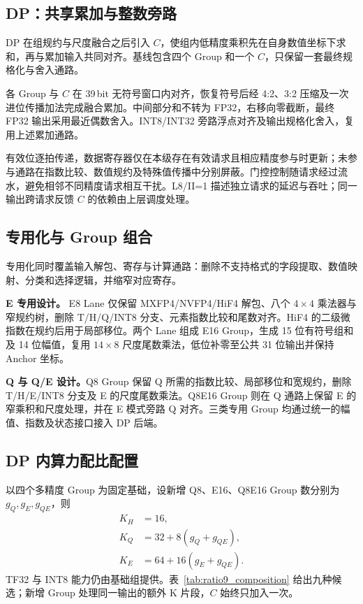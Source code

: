 \subsection{DP：共享累加与整数旁路}

DP 在组规约与尺度融合之后引入 $C$，使组内低精度乘积先在自身数值坐标下求和，再与累加输入共同对齐。基线包含四个 Group 和一个 $C$，只保留一套最终规格化与舍入通路。

各 Group 与 $C$ 在 39\,bit 无符号窗口内对齐，恢复符号后经 4:2、3:2 压缩及一次进位传播加法完成融合累加。中间部分和不转为 FP32，右移向零截断，最终 FP32 输出采用最近偶数舍入。INT8/INT32 旁路浮点对齐及输出规格化舍入，复用上述累加通路。

有效位逐拍传递，数据寄存器仅在本级存在有效请求且相应精度参与时更新；未参与通路在指数比较、数值规约及特殊值传播中分别屏蔽。门控控制随请求经过流水，避免相邻不同精度请求相互干扰。L8/II=1 描述独立请求的延迟与吞吐；同一输出跨请求反馈 $C$ 的依赖由上层调度处理。

\subsection{专用化与 Group 组合}
\label{sec:specialized_midgroups}

专用化同时覆盖输入解包、寄存与计算通路：删除不支持格式的字段提取、数值映射、分类和选择逻辑，并缩窄对应寄存。

\textbf{E 专用设计。} E8 Lane 仅保留 MXFP4/NVFP4/HiF4 解包、八个 $4\times4$ 乘法器与窄规约树，删除 T/H/Q/INT8 分支、元素指数比较和尾数对齐。HiF4 的二级微指数在规约后用于局部移位。两个 Lane 组成 E16 Group，生成 15 位有符号组和及 14 位幅值，复用 $14\times8$ 尺度尾数乘法，低位补零至公共 31 位输出并保持 Anchor 坐标。

\textbf{Q 与 Q/E 设计。}Q8 Group 保留 Q 所需的指数比较、局部移位和宽规约，删除 T/H/E/INT8 分支及 E 的尺度尾数乘法。Q8E16 Group 则在 Q 通路上保留 E 的窄乘积和尺度处理，并在 E 模式旁路 Q 对齐。三类专用 Group 均通过统一的幅值、指数及状态接口接入 DP 后端。

\subsection{DP 内算力配比配置}
\label{sec:expansion}

以四个多精度 Group 为固定基础，设新增 Q8、E16、Q8E16 Group 数分别为 $g_Q,g_E,g_{QE}$，则
\begin{equation}
\begin{aligned}
K_H&=16,\\
K_Q&=32+8(g_Q+g_{QE}),\\
K_E&=64+16(g_E+g_{QE}).
\end{aligned}
\label{eq:group_capacity}
\end{equation}
TF32 与 INT8 能力仍由基础组提供。表~\ref{tab:ratio9_composition} 给出九种候选；新增 Group 处理同一输出的额外 K 片段，$C$ 始终只加入一次。

